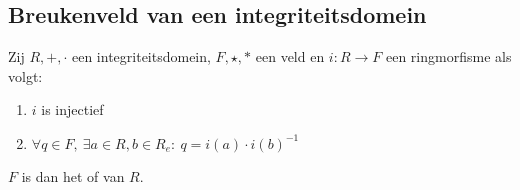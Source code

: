 \documentclass[main.tex]{subfiles}
\begin{document}
\subsection{Breukenveld van een integriteitsdomein}
\label{sec:breukenveld-van-een-integriteitsdomein}

\begin{de}
  Zij $R,+,\cdot$ een integriteitsdomein, $F,\star,*$ een veld en $i: R \rightarrow F$ een ringmorfisme als volgt:
  \begin{enumerate}
  \item $i$ is injectief
  \item $\forall q \in F,\ \exists a \in R, b\in R_{e}:\ q = i(a)\cdot i(b)^{-1}$
  \end{enumerate}
  $F$ is dan het  of  van $R$.
\end{de}
\end{document}
